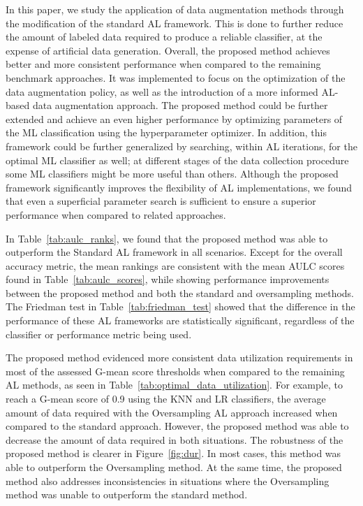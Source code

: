In this paper, we study the application of data augmentation methods through
the modification of the standard AL framework. This is done to further reduce
the amount of labeled data required to produce a reliable classifier, at the
expense of artificial data generation. Overall, the proposed method
achieves better and more consistent performance when compared to the remaining
benchmark approaches. It was implemented to focus on the optimization of the
data augmentation policy, as well as the introduction of a more informed
AL-based data augmentation approach. The proposed method could be further
extended and achieve an even higher performance by optimizing parameters of
the ML classification using the hyperparameter optimizer. In addition, this
framework could be further generalized by searching, within AL iterations, for
the optimal ML classifier as well; at different stages of the data collection
procedure some ML classifiers might be more useful than others. Although the
proposed framework significantly improves the flexibility of AL
implementations, we found that even a superficial parameter search is
sufficient to ensure a superior performance when compared to related
approaches.
 
In Table~\ref{tab:aulc_ranks}, we found that the proposed method was able to
outperform the Standard AL framework in all scenarios. Except for the overall
accuracy metric, the mean rankings are consistent with the mean AULC scores
found in Table~\ref{tab:aulc_scores}, while showing performance improvements
between the proposed method and both the standard and oversampling methods.
The Friedman test in Table~\ref{tab:friedman_test} showed that the difference
in the performance of these AL frameworks are statistically significant,
regardless of the classifier or performance metric being used.
 
The proposed method evidenced more consistent data utilization requirements in
most of the assessed G-mean score thresholds when compared to the remaining AL
methods, as seen in Table~\ref{tab:optimal_data_utilization}. For example, to
reach a G-mean score of 0.9 using the KNN and LR classifiers, the average
amount of data required with the Oversampling AL approach increased when
compared to the standard approach. However, the proposed method was able to
decrease the amount of data required in both situations. The robustness of the
proposed method is clearer in Figure~\ref{fig:dur}. In most cases, this method
was able to outperform the Oversampling method. At the same time, the proposed
method also addresses inconsistencies in situations where the Oversampling
method was unable to outperform the standard method.

